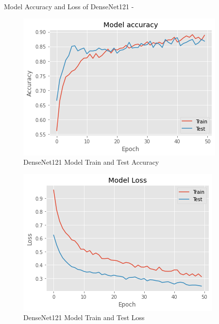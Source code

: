 \newpage
\vspace{5mm}
\noindent Model Accuracy and Loss of DenseNet121 -
\vspace{5mm}
\begin{figure}[hbt!]
\centering
\includegraphics[scale=1]{images/fig-31.png}
\caption{DenseNet121 Model Train and Test Accuracy}
\label{fig:x DenseNet121 Model Train and Test Accuracy}
\end{figure}

\vspace{5mm}
\begin{figure}[hbt!]
\centering
\includegraphics[scale=1]{images/fig-32.png}
\caption{DenseNet121 Model Train and Test Loss}
\label{fig:x DenseNet121 Model Train and Test Loss}
\end{figure}

